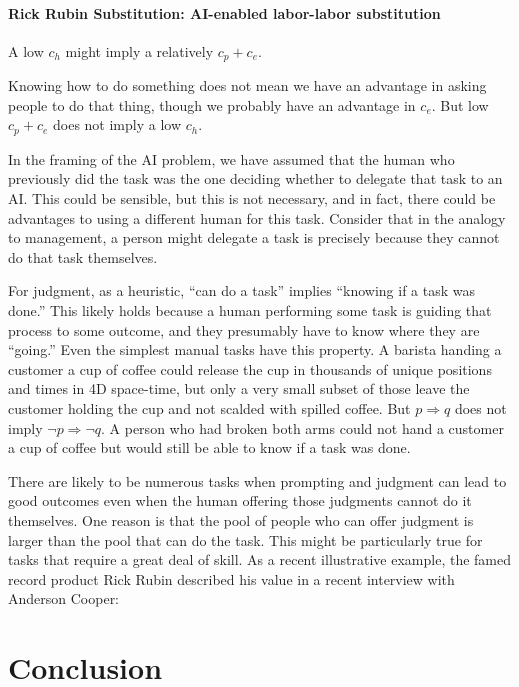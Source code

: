 \documentclass{article}
\begin{document}
\paragraph{Rick Rubin Substitution: AI-enabled labor-labor substitution}

A low $c_h$ might imply a relatively $c_p + c_e$.

Knowing how to do something does not mean we have an advantage in asking people to do that thing, though we probably have an advantage in $c_e$.
But low $c_p + c_e$ does not imply a low $c_h$.

In the framing of the AI problem, we have assumed that the human who previously did the task was the one deciding whether to delegate that task to an AI. 
This could be sensible, but this is not necessary, and in fact, there could be advantages to using a different human for this task.
Consider that in the analogy to management, a person might delegate a task is precisely because they cannot do that task themselves. 

For judgment, as a heuristic, ``can do a task'' implies ``knowing if a task was done.''
This likely holds because a human performing some task is guiding that process to some outcome, and they presumably have to know where they are ``going.''
Even the simplest manual tasks have this property.  
A barista handing a customer a cup of coffee could release the cup in thousands of unique positions and times in 4D space-time, but only a very small subset of those leave the customer holding the cup and not scalded with spilled coffee. 
But $p \Rightarrow q$ does not imply $\neg p \Rightarrow \neg q$.
A person who had broken both arms could not hand a customer a cup of coffee but would still be able to know if a task was done.

There are likely to be numerous tasks when prompting and judgment can lead to good outcomes even when the human offering those judgments cannot do it themselves.
One reason is that the pool of people who can offer judgment is larger than the pool that can do the task. 
This might be particularly true for tasks that require a great deal of skill.
As a recent illustrative example,  the famed record product Rick Rubin described his value in a recent interview with Anderson Cooper:

\section{Conclusion}
\end{document}
